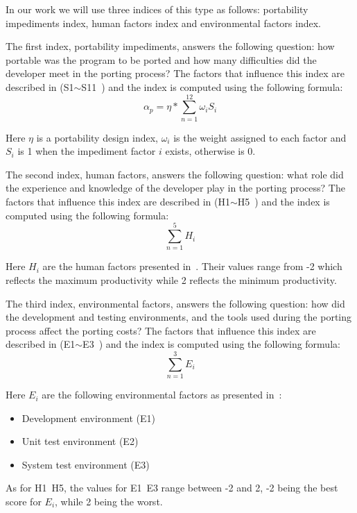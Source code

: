 In our work we will use three indices of this type as follows: portability
impediments index, human factors index and environmental factors index.

The first index, portability impediments, answers the following question: how
portable was the program to be ported and how many difficulties did the
developer meet in the porting process? The factors that influence this index are
described in (S1$\sim$S11~\cite{b2}) and the index is computed using the
following formula: \[ \alpha_p = \eta * \sum_{n=1}^{12} \omega_i S_i \]

Here $\eta$ is a portability design index, $\omega_i$ is the weight assigned to
each factor and $S_i$ is 1 when the impediment factor $i$ exists, otherwise is
0.

The second index, human factors, answers the following question: what role did
the experience and knowledge of the developer play in the porting process? The
factors that influence this index are described in (H1$\sim$H5~\cite{b2}) and
the index is computed using the following formula: \[ \sum_{n=1}^{5} H_i \]

Here $H_i$ are the human factors presented in~\cite{b2}. Their values range
from -2 which reflects the maximum productivity while 2 reflects the minimum
productivity.

The third index, environmental factors, answers the following question: how did
the development and testing environments, and the tools used during the porting
process affect the porting costs? The factors that influence this index are
described in (E1$\sim$E3~\cite{b2}) and the index is computed using the
following formula: \[ \sum_{n=1}^{3} E_i \]

Here $E_i$ are the following environmental factors as presented in~\cite{b2}:
\begin{itemize}
    \item Development environment (E1)
    \item Unit test environment (E2)
    \item System test environment (E3)
\end{itemize}
As for H1~H5, the values for E1~E3 range between -2 and 2, -2 being the best
score for $E_i$, while 2 being the worst.
